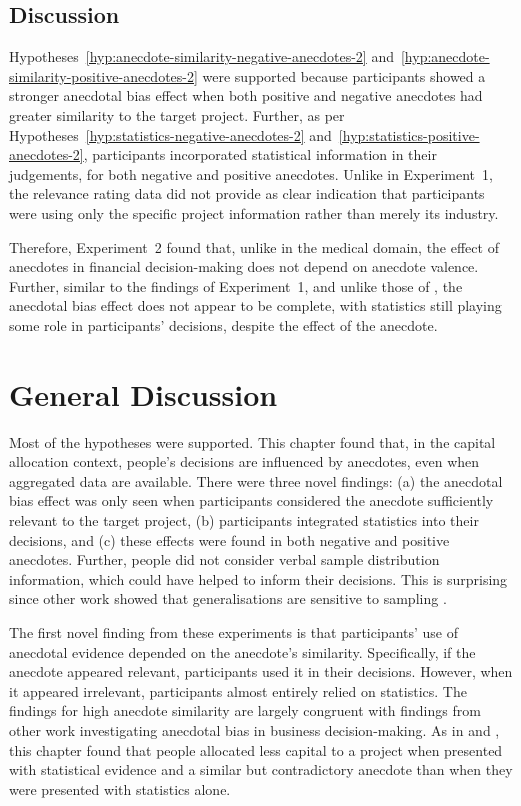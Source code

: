 \documentclass[a4paper, nobind]{templates/ociamthesis}
\theoremstyle{definition}
\theoremstyle{definition}
\theoremstyle{definition}
\theoremstyle{definition}
\theoremstyle{remark}
\begin{document}
\subsection{Discussion}

Hypotheses~\ref{hyp:anecdote-similarity-negative-anecdotes-2}
and~\ref{hyp:anecdote-similarity-positive-anecdotes-2} were supported because
participants showed a stronger anecdotal bias effect when both positive and
negative anecdotes had greater similarity to the target project. Further, as per
Hypotheses~\ref{hyp:statistics-negative-anecdotes-2}
and~\ref{hyp:statistics-positive-anecdotes-2}, participants incorporated
statistical information in their judgements, for both negative and positive
anecdotes. Unlike in Experiment~1, the relevance rating data did not provide as
clear indication that participants were using only the specific project
information rather than merely its industry.

Therefore, Experiment~2 found that, unlike in the medical domain, the effect of
anecdotes in financial decision-making does not depend on anecdote valence.
Further, similar to the findings of Experiment~1, and unlike those of
\textcite{wainberg2013}, the anecdotal bias effect does not appear to be complete, with
statistics still playing some role in participants' decisions, despite the
effect of the anecdote.

\section{General Discussion}

Most of the hypotheses were supported. This chapter found that, in the capital
allocation context, people's decisions are influenced by anecdotes, even when
aggregated data are available. There were three novel findings: (a) the
anecdotal bias effect was only seen when participants considered the anecdote
sufficiently relevant to the target project, (b) participants integrated
statistics into their decisions, and (c) these effects were found in both
negative and positive anecdotes. Further, people did not consider verbal sample
distribution information, which could have helped to inform their decisions.
This is surprising since other work showed that generalisations are sensitive to
sampling \autocite{carvalho2021}.

The first novel finding from these experiments is that participants' use of
anecdotal evidence depended on the anecdote's similarity. Specifically, if the
anecdote appeared relevant, participants used it in their decisions. However,
when it appeared irrelevant, participants almost entirely relied on statistics.
The findings for high anecdote similarity are largely congruent with findings
from other work investigating anecdotal bias in business decision-making. As in
\textcite{wainberg2013} and \textcite{wainberg2018}, this chapter found that people allocated less
capital to a project when presented with statistical evidence and a similar but
contradictory anecdote than when they were presented with statistics alone.
\end{document}
